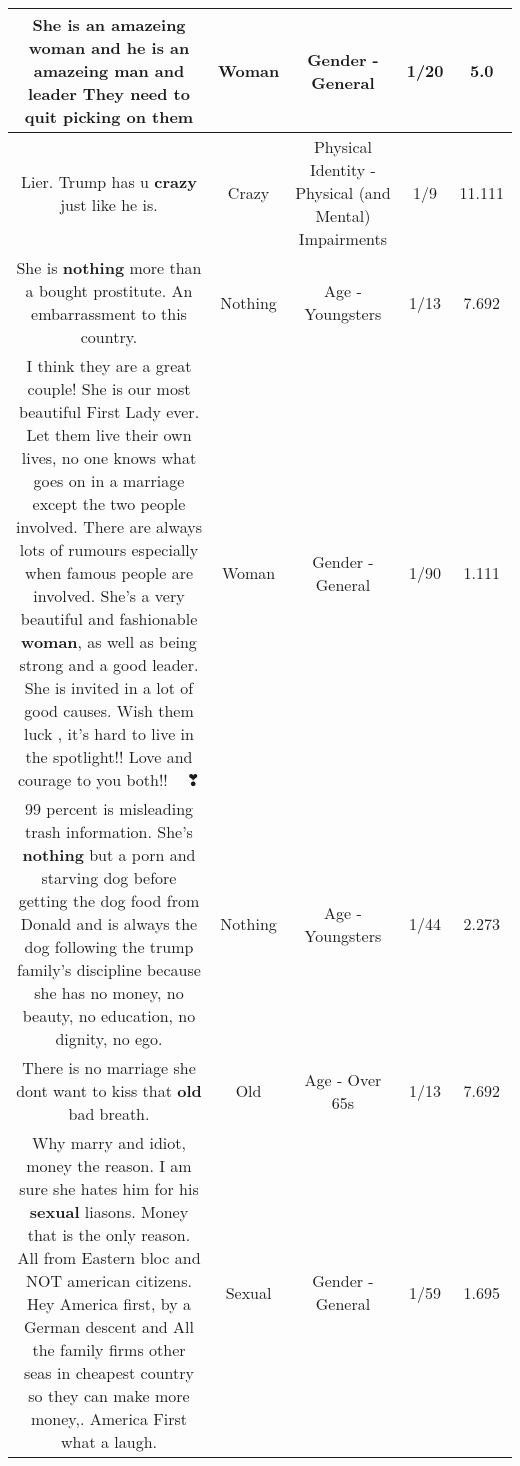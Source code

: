 \documentclass[11pt]{article}
\newlength\mylength
\begin{document}
\begin{center}
\begin{longtable}{|C{.65\mylength}|C{.30\mylength}|C{.12\mylength}|C{.12\mylength}|C{.12\mylength}|}
  \small She is an amazeing \textbf{woman} and he is  an  amazeing  man and leader  They need to  quit  picking on them\normalsize   & Woman & Gender - General & 1/20 & 5.0 \\  \hline
  \small Lier. Trump has u \textbf{crazy} just like he is.\normalsize   & Crazy & Physical Identity - Physical (and Mental) Impairments & 1/9 & 11.111 \\  \hline
  \small She is \textbf{nothing} more than a bought prostitute. An embarrassment to this country.\normalsize   & Nothing & Age - Youngsters & 1/13 & 7.692 \\  \hline
  \small I think  they  are  a great  couple!  She is  our  most  beautiful  First  Lady  ever.  Let  them  live  their  own  lives,  no one  knows  what  goes  on  in  a marriage except  the  two  people  involved.  There  are  always  lots  of  rumours  especially  when  famous  people  are  involved. She's  a  very  beautiful  and  fashionable  \textbf{woman},  as well  as  being  strong and  a good  leader.  She  is  invited  in  a  lot of  good  causes.  Wish  them luck , it's  hard  to  live  in  the  spotlight!!  Love  and  courage  to  you  both!!  💝💝🥰❣\normalsize   & Woman & Gender - General & 1/90 & 1.111 \\  \hline
  \small 99 percent is misleading trash information. She's \textbf{nothing} but a porn and starving dog before getting the dog food from Donald  and is always the dog following the trump family's discipline because she has no money, no beauty, no education, no dignity, no ego.\normalsize   & Nothing & Age - Youngsters & 1/44 & 2.273 \\  \hline
  \small There is no marriage  she dont want to kiss that \textbf{old} bad breath.\normalsize   & Old & Age - Over 65s & 1/13 & 7.692 \\  \hline
  \small Why marry and idiot, money the reason.  I am sure she hates him for his \textbf{sexual} liasons.  Money that is the only reason. All from Eastern bloc and NOT american citizens.  Hey America first, by a German descent and All the family firms other seas in cheapest country so they can make more money,. America First what a laugh.\normalsize   & Sexual & Gender - General & 1/59 & 1.695 \\  \hline

\end{longtable}
\end{center}
\end{document}
